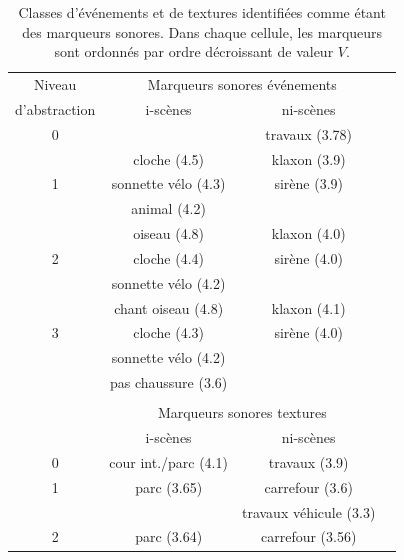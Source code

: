 
\begin{table}[t]
 \setlength{\tabcolsep}{0.2pt}
 \centering
  {\renewcommand{\arraystretch}{0.9}
\begin{tabular}{c c c c} 
Niveau        & \multicolumn{2}{c}{Marqueurs sonores événements} \\
d'abstraction & i-scènes & ni-scènes \\
\hline
0  &                          &  travaux (3.78)  \\
\hline
  & cloche  (4.5)             & klaxon  (3.9) \\
1 & sonnette vélo  (4.3)      & sirène (3.9)\\
  & animal (4.2)              &       \\
   \hline
  & oiseau        (4.8)       & klaxon  (4.0)\\
2 & cloche  (4.4)             & sirène (4.0)\\
  & sonnette vélo    (4.2)             &       \\
   \hline
  & chant oiseau (4.8)        & klaxon  (4.1)\\
3 & cloche   (4.3)            & sirène (4.0)\\
  & sonnette vélo     (4.2)   &       \\
  & pas chaussure  (3.6)      &  \\
  &                           & \\ 
  & \multicolumn{2}{c}{Marqueurs sonores textures}      \\
  & i-scènes & ni-scènes \\
\hline
0 &     cour int./parc (4.1) &  travaux (3.9)  \\
\hline
1 &     parc (3.65)          &  carrefour (3.6)  \\
  &                          &  travaux véhicule (3.3)  \\
\hline
2 &     parc (3.64)          &  carrefour (3.56)  \\
\hline
\end{tabular}
} 
\vspace{0.5mm}
\caption[Classes d'événements et de textures identifiées comme étant des marqueurs sonores.]{Classes d'événements et de textures identifiées comme étant des marqueurs sonores. Dans chaque cellule, les marqueurs sont ordonnés par ordre décroissant de valeur $V$.}
\label{tab:markers}
\end{table}

